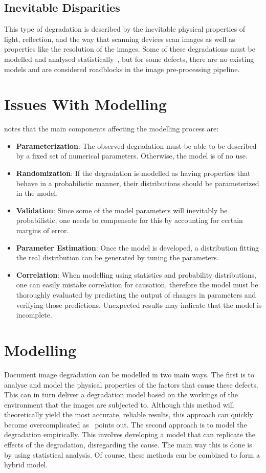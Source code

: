 \documentclass[a4paper, 12pt]{report}
\begin{document}
\subsection{Inevitable Disparities}
This type of degradation is described by the inevitable physical properties of light, reflection, and the way that scanning devices scan images as well as properties like the resolution of the images. Some of these degradations must be modelled and analysed statistically~\cite{Baird2007}, but for some defects, there are no existing models and are considered roadblocks in the image pre-processing pipeline.


\section{Issues With Modelling}
\cite{Baird2007} notes that the main components affecting the modelling process are:
\begin{itemize}
    \item \textbf{Parameterization}: The observed degradation must be able to be described by a fixed set of numerical parameters. Otherwise, the model is of no use.
    \item \textbf{Randomization}: If the degradation is modelled as having properties that behave in a probabilistic manner, their distributions should be parameterized in the model.
    \item \textbf{Validation}: Since some of the model parameters will inevitably be probabilistic, one needs to compensate for this by accounting for certain margins of error.
    \item \textbf{Parameter Estimation}: Once the model is developed, a distribution fitting the real distribution can be generated by tuning the parameters.
    \item \textbf{Correlation}: When modelling using statistics and probability distributions, one can easily mistake correlation for causation, therefore the model must be thoroughly evaluated by predicting the output of changes in parameters and verifying those predictions. Unexpected results may indicate that the model is incomplete.
\end{itemize}

\section{Modelling}
Document image degradation can be modelled in two main ways. The first is to analyse and model the physical properties of the factors that cause these defects. This can in turn deliver a degradation model based on the workings of the environment that the images are subjected to. Although this method will theoretically yield the most accurate, reliable results, this approach can quickly become overcomplicated as~\cite{Baird2007} points out. The second approach is to model the degradation empirically. This involves developing a model that can replicate the effects of the degradation, disregarding the cause. The main way this is done is by using statistical analysis. Of course, these methods can be combined to form a hybrid model.
\end{document}
